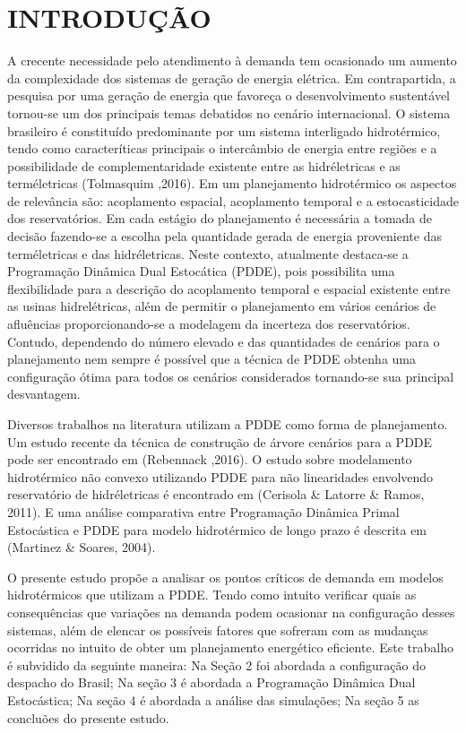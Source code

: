 \documentclass[12pt,fleqn]{article}
\begin{document}
\section{INTRODU\c C\~AO}
A crecente necessidade pelo atendimento \`a demanda tem ocasionado um aumento da complexidade dos
sistemas de gera\c c\~ao de energia el\'etrica. Em contrapartida, a pesquisa por uma gera\c c\~ao de energia que favore\c
ca o desenvolvimento sustent\'avel tornou-se um dos principais temas debatidos no cen\'ario internacional. O sistema brasileiro \'e constitu\'ido predominante por um sistema interligado
hidrot\'ermico, tendo como caracter\'iticas principais o interc\^ambio de energia entre regi\~oes e a possibilidade de
complementaridade existente entre as hidr\'eletricas e as term\'eletricas (Tolmasquim ,2016). Em um planejamento hidrot\'ermico os aspectos
de relev\^ancia s\~ao: acoplamento espacial, acoplamento temporal e a estocasticidade dos reservat\'orios. Em cada
est\'agio do planejamento \'e necess\'aria a tomada de decis\~ao fazendo-se a escolha pela quantidade gerada de energia
proveniente das term\'eletricas e das hidr\'eletricas. Neste
contexto, atualmente destaca-se a Programa\c c\~ao Din\^amica Dual
Estoc\'atica (PDDE), pois possibilita uma flexibilidade para a descri\c c\~ao do acoplamento temporal e espacial existente entre as
usinas hidrel\'etricas, al\'em de permitir o  planejamento em v\'arios cen\'arios de aflu\^encias proporcionando-se a
modelagem da incerteza dos reservat\'orios. Contudo, dependendo do n\'umero elevado e das quantidades de cen\'arios  para o planejamento
nem sempre \'e poss\'ivel que a t\'ecnica de PDDE obtenha uma configura\c c\~ao \'otima para todos os cen\'arios
considerados tornando-se sua principal desvantagem.

Diversos trabalhos na literatura utilizam a PDDE como forma de planejamento. Um estudo recente da t\'ecnica
de constru\c c\~ao de \'arvore cen\'arios para a PDDE pode ser encontrado em (Rebennack
,2016). O estudo sobre modelamento hidrot\'ermico n\~ao convexo utilizando PDDE para n\~ao linearidades envolvendo reservat\'orio de
hidr\'eletricas \'e encontrado em (Cerisola \& Latorre \& Ramos,
2011). E uma an\'alise comparativa entre Programa\c c\~ao Din\^amica Primal Estoc\'astica e PDDE para modelo
hidrot\'ermico de longo prazo \'e descrita em (Martinez \&
Soares, 2004). 

O presente estudo propõe a analisar os pontos cr\'iticos de demanda em modelos hidrot\'ermicos que utilizam a PDDE.
Tendo como intuito verificar quais as consequ\^encias que varia\c c\~oes na demanda podem ocasionar na configura\c c\~ao
desses sistemas, al\'em de elencar os poss\'iveis fatores que sofreram com as mudan\c cas ocorridas no intuito de obter
um planejamento energ\'etico eficiente. Este trabalho \'e
subvidido da seguinte maneira: Na Se\c c\~ao 2 foi abordada a configura\c c\~ao do despacho do Brasil; Na se\c c\~ao 3
\'e abordada a Programa\c c\~ao Din\^amica Dual Estoc\'astica; Na se\c c\~ao 4 \'e abordada a an\'alise das simula\c
c\~oes; Na se\c c\~ao 5 as conclu\~oes do presente estudo. 
\end{document}
